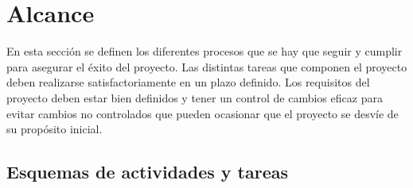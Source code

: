 \documentclass[11pt,a4paper,spanish,twoside]{report}
\begin{document}
\tableofcontents

\chapter{Alcance}
En esta sección se definen los diferentes procesos que se hay que seguir y
cumplir para asegurar el éxito del proyecto. Las distintas tareas que
componen el proyecto deben realizarse satisfactoriamente en un plazo
definido.
Los requisitos del proyecto deben estar bien definidos y tener un control de
cambios eficaz para evitar cambios no controlados que pueden ocasionar que el
proyecto se desvíe de su propósito inicial.

\section{Esquemas de actividades y tareas}
\end{document}
